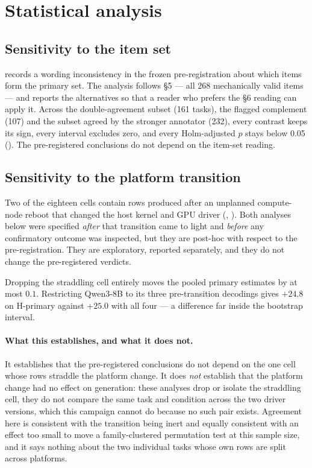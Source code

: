 \section{Statistical analysis}
\label{sec:statistics}



\subsection{Sensitivity to the item set}

 records a wording inconsistency in the frozen pre-registration about which items form the
primary set. The analysis follows \S5 --- all 268 mechanically valid items --- and reports the alternatives so
that a reader who prefers the \S6 reading can apply it. Across the double-agreement subset (161 tasks), the
flagged complement (107) and the subset agreed by the stronger annotator (232), every contrast keeps its sign,
every interval excludes zero, and every Holm-adjusted $p$ stays below 0.05 (). The
pre-registered conclusions do not depend on the item-set reading.

\subsection{Sensitivity to the platform transition}

Two of the eighteen cells contain rows produced after an unplanned compute-node reboot that changed the host
kernel and GPU driver (, ). Both analyses below were specified
\emph{after} that transition came to light and \emph{before} any confirmatory outcome was inspected, but they are
post-hoc with respect to the pre-registration. They are exploratory, reported separately, and they do not change
the pre-registered verdicts.

Dropping the straddling cell entirely moves the pooled primary estimates by at most $0.1$\pp. Restricting Qwen3-8B
to its three pre-transition decodings gives $+24.8$\pp{} on H-primary against $+25.0$\pp{} with all four --- a
difference far inside the bootstrap interval.

\paragraph{What this establishes, and what it does not.} It establishes that the pre-registered conclusions do not
depend on the one cell whose rows straddle the platform change. It does \emph{not} establish that the platform
change had no effect on generation: these analyses drop or isolate the straddling cell, they do not compare the
same task and condition across the two driver versions, which this campaign cannot do because no such pair exists.
Agreement here is consistent with the transition being inert and equally consistent with an effect too small to
move a family-clustered permutation test at this sample size, and it says nothing about the two individual tasks
whose own rows are split across platforms.

